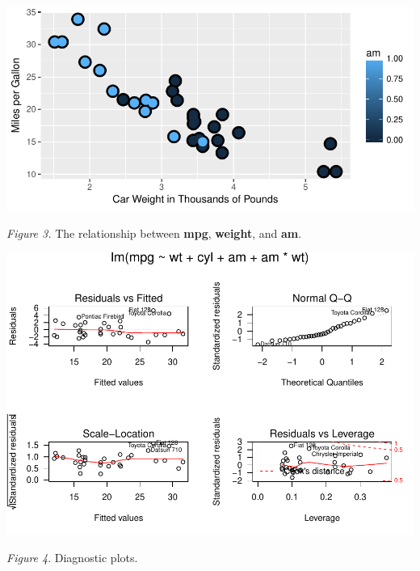 \documentclass[]{article}
\begin{document}
\includegraphics{Regression_Models_Course_Project_files/figure-latex/morePlots-1.pdf}

\emph{Figure 3.} The relationship between \textbf{mpg}, \textbf{weight},
and \textbf{am}.

\includegraphics{Regression_Models_Course_Project_files/figure-latex/residual_plots-1.pdf}

\emph{Figure 4}. Diagnostic plots.
\end{document}
